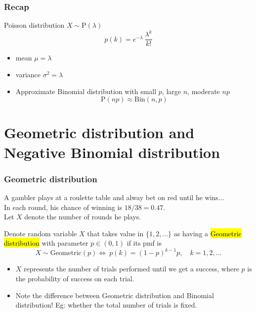 \documentclass[slidestop,compress,mathserif]{beamer}
\begin{document}
\begin{frame}\frametitle{Recap}

Poisson distribution $X \sim \text{P}(\lambda) $
\[ p(k) = e^{-\lambda}\ \frac{\lambda^k}{k!}\]
\begin{itemize}
\item mean $\mu = \lambda$
\item variance $\sigma^2 =  \lambda$
\item Approximate Binomial distribution with small $p$, large $n$, moderate $np$
\[ \text{P}(np) \approx \text{Bin}(n,p) \]
\end{itemize}


\end{frame}



\section{Geometric distribution and Negative Binomial distribution}

\begin{frame}\frametitle{Geometric distribution}

A gambler plays at a roulette table and alway bet on red until he wins...\\
In each round, his chance of winning is $18/38 = 0.47$.\\
Let $X$ denote the number of rounds he plays.

\pause
\begin{defn}
Denote random variable $X$ that takes value in $\{1, 2, \ldots\}$ as having a \hl{Geometric distribution}
 with parameter $p \in (0, 1)$ if its pmf is
\[ X \sim \text{Geometric}(p) \Longleftrightarrow\ p(k) = (1-p)^{k-1}p,\quad k = 1, 2, \ldots \]
\end{defn}
\pause
\begin{itemize}
\item $X$ represents the number of trials performed until we get a success, where $p$ is the probability of success on each trial.
\pause
\item Note the difference between Geometric distribution and Binomial distribution!
\pause Eg: whether the total number of trials is fixed.
\end{itemize}

\end{frame}
\end{document}
